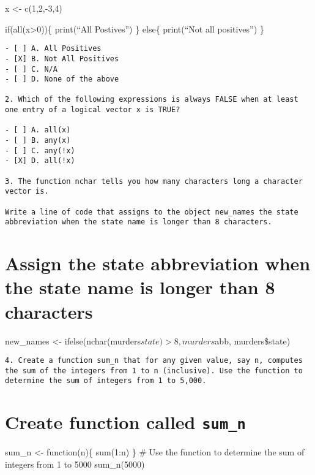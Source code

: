 \documentclass[
]{article}
\begin{document}
x \textless- c(1,2,-3,4)

if(all(x\textgreater0))\{ print(``All Postives'') \} else\{ print(``Not
all positives'') \}

\begin{verbatim}
- [ ] A. All Positives
- [X] B. Not All Positives
- [ ] C. N/A
- [ ] D. None of the above

2. Which of the following expressions is always FALSE when at least one entry of a logical vector x is TRUE?

- [ ] A. all(x)
- [ ] B. any(x)
- [ ] C. any(!x)
- [X] D. all(!x)

3. The function nchar tells you how many characters long a character vector is.

Write a line of code that assigns to the object new_names the state abbreviation when the state name is longer than 8 characters.
\end{verbatim}

\hypertarget{assign-the-state-abbreviation-when-the-state-name-is-longer-than-8-characters}{%
\section{Assign the state abbreviation when the state name is longer
than 8
characters}\label{assign-the-state-abbreviation-when-the-state-name-is-longer-than-8-characters}}

new\_names \textless- ifelse(nchar(murders\(state)>8, murders\)abb,
murders\$state)

\begin{verbatim}
4. Create a function sum_n that for any given value, say n, computes the sum of the integers from 1 to n (inclusive). Use the function to determine the sum of integers from 1 to 5,000.
\end{verbatim}

\hypertarget{create-function-called-sum_n}{%
\section{\texorpdfstring{Create function called
\texttt{sum\_n}}{Create function called sum\_n}}\label{create-function-called-sum_n}}

sum\_n \textless- function(n)\{ sum(1:n) \} \# Use the function to
determine the sum of integers from 1 to 5000 sum\_n(5000)

\begin{verbatim}
\end{verbatim}
\end{document}
